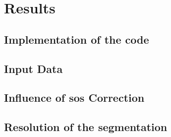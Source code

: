\chapter{Results}
\label{chap:results}

\section{Implementation of the code}


\section{Input Data}

\section{Influence of \ac{sos} Correction }

\section{Resolution of the segmentation}
